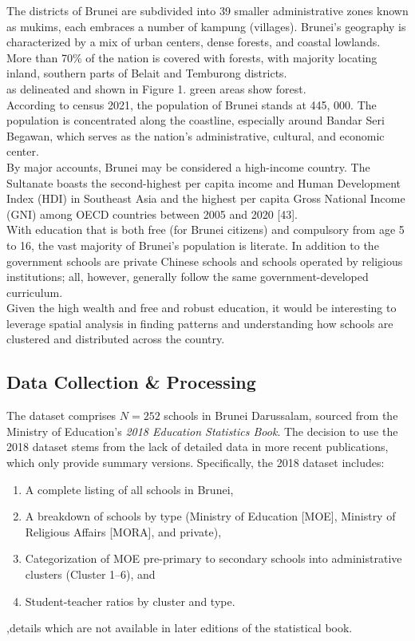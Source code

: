 \documentclass[12pt]{article}
\begin{document}
The districts of Brunei are subdivided into 39 smaller administrative zones known as mukims, each embraces a number of kampung (villages). Brunei’s geography is characterized by a mix of urban centers, dense forests, and coastal lowlands. More than 70\% of the nation is covered with forests, with majority locating inland, southern parts of Belait and Temburong districts. \\

as delineated and shown in Figure 1. green areas show forest. \\

According to census 2021, the population of Brunei stands at 445, 000. The population is concentrated along the coastline, especially around Bandar Seri Begawan, which serves as the nation’s administrative, cultural, and economic center. \\

By major accounts, Brunei may be considered a high-income country. The Sultanate boasts the second-highest per capita income and Human Development Index (HDI) in Southeast Asia and the highest per capita Gross National Income (GNI) among OECD countries between 2005 and 2020 [43]. \\
 
With education that is both free (for Brunei citizens) and compulsory from age 5 to 16, the vast majority of Brunei’s population is literate. In addition to the government schools are private Chinese schools and schools operated by religious institutions; all, however, generally follow the same government-developed curriculum. \\

Given the high wealth and free and robust education, it would be interesting to leverage spatial analysis in finding patterns and understanding how schools are clustered and distributed across the country.\\

\subsection{Data Collection \& Processing}
The dataset comprises \( N = 252 \) schools in Brunei Darussalam, sourced from the Ministry of Education’s \textit{2018 Education Statistics Book}. The decision to use the 2018 dataset stems from the lack of detailed data in more recent publications, which only provide summary versions. Specifically, the 2018 dataset includes:
\begin{enumerate}
    \item A complete listing of all schools in Brunei,
    \item A breakdown of schools by type (Ministry of Education [MOE], Ministry of Religious Affairs [MORA], and private),
    \item Categorization of MOE pre-primary to secondary schools into administrative clusters (Cluster 1–6), and
    \item Student-teacher ratios by cluster and type.
\end{enumerate}
,details which are not available in later editions of the statistical book. \\
\end{document}
